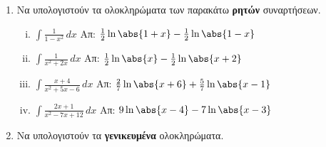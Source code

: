 \documentclass[a4paper,table]{report}
\begin{document}
\begin{enumerate}
  \item Να υπολογιστούν τα ολοκληρώματα των παρακάτω \textbf{ρητών} συναρτήσεων.
    \begin{enumerate}[i)]
      \item $ \int \frac{1}{1-x^{2}} \,{dx} $ \hfill Απ: $ \frac{1}{2} \ln{\abs{1+x} - 
        \frac{1}{2} \ln{\abs{1-x}}} $
      \item $ \int \frac{1}{x^{2}+2x} \,{dx} $ \hfill Απ: $ \frac{1}{2} \ln{\abs{x}} -
        \frac{1}{2} \ln{\abs{x+2}} $ 
      \item $ \int \frac{x+4}{x^{2}+5x-6} \,{dx} $ \hfill Απ: $ \frac{2}{7}
        \ln{\abs{x+6}} + \frac{5}{7} \ln{\abs{x-1}} $
      \item $ \int \frac{2x+1}{x^{2}-7x+12} \,{dx} $ \hfill Απ: $ 9 \ln{\abs{x-4}} - 7
        \ln{\abs{x-3}} $ 
    \end{enumerate}

  \item Να υπολογιστούν τα \textbf{γενικευμένα} ολοκληρώματα.

\end{enumerate}
\end{document}
